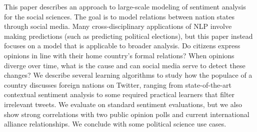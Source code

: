 This paper describes an approach to large-scale modeling of sentiment analysis for the social sciences. The goal is to model relations between nation states through social media. Many cross-disciplinary applications of NLP involve making predictions (such as predicting political elections), but this paper instead focuses on a model that is applicable to broader analysis. Do citizens express opinions in line with their home country's formal relations? When opinions diverge over time, what is the cause and can social media serve to detect these changes? We describe several learning algorithms to study how the populace of a country discusses foreign nations on Twitter, ranging from state-of-the-art contextual sentiment analysis to some required practical learners that filter irrelevant tweets. We evaluate on standard sentiment evaluations, but we also show strong correlations with two public opinion polls and current international alliance relationships. We conclude with some political science use cases.

